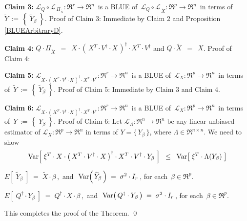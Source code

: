 \begin{enumerate}
	\vskip 0.5cm
	\noindent
	\textbf{Claim 3:}\quad
	$\mathcal{L}_{Q} \circ \mathcal{L}_{\,\Pi_{\widetilde{X}}} : \Re^{r} \longrightarrow \Re^{n}$\,
	is a BLUE of 
	\,$\mathcal{L}_{Q} \circ \mathcal{L}_{\,\widetilde{X}} : \Re^{p} \longrightarrow \Re^{n}$\,
	in terms of
	\,$\widetilde{Y} \,:=\, \left\{\;\widetilde{Y}_{\beta}\;\right\}$.
	\vskip 0.0cm
	\noindent
	Proof of Claim 3:\quad
	Immediate by Claim 2 and Proposition \ref{BLUEArbitraryD}.
	
	\vskip 0.5cm
	\noindent
	\textbf{Claim 4:}\quad
	$Q \cdot \Pi_{\widetilde{X}}$
	\,$=$\, $X \cdot \left(\,X^{T} \cdot V^{\dagger} \cdot X\,\right)^{\dagger} \cdot X^{T} \cdot V^{\dagger}$
	\;\;and\;\;
	$Q \cdot \widetilde{X}$ \,$=$\, $X$.
	\vskip 0.0cm
	\noindent
	Proof of Claim 4:\quad

	\vskip 0.5cm
	\noindent
	\textbf{Claim 5:}\quad
	$\mathcal{L}_{X \cdot \left(\,X^{T} \cdot V^{\dagger} \cdot X\,\right)^{\dagger} \cdot X^{T} \cdot V^{\dagger}}
	: \Re^{r} \longrightarrow \Re^{n}$\,
	is a BLUE of 
	\,$\mathcal{L}_{X} : \Re^{p} \longrightarrow \Re^{n}$\,
	in terms of
	\,$\widetilde{Y} \,:=\, \left\{\;\widetilde{Y}_{\beta}\;\right\}$.
	\vskip 0.0cm
	\noindent
	Proof of Claim 5:\quad
	Immediate by Claim 3 and Claim 4.

	\vskip 0.5cm
	\noindent
	\textbf{Claim 6:}\quad
	$\mathcal{L}_{X \cdot \left(\,X^{T} \cdot V^{\dagger} \cdot X\,\right)^{\dagger} \cdot X^{T} \cdot V^{\dagger}}
	: \Re^{r} \longrightarrow \Re^{n}$\,
	is a BLUE of 
	\,$\mathcal{L}_{X} : \Re^{p} \longrightarrow \Re^{n}$\,
	in terms of
	\,$Y \,:=\, \left\{\;Y_{\beta}\;\right\}$.
	\vskip 0.0cm
	\noindent
	Proof of Claim 6:\quad
	Let $\mathcal{L}_{\Lambda} : \Re^{n} \longrightarrow \Re^{n}$ be any linear unbiased estimator
	of $\mathcal{L}_{X} : \Re^{p} \longrightarrow \Re^{n}$ in terms of $Y = \{\,Y_{\beta}\,\}$,
	where $\Lambda \in \Re^{n \times n}$.
	We need to show
	\begin{equation*}
	\textnormal{Var}\!\left[\;
		\xi^{T}
		\cdot
		X \cdot \left(\,X^{T} \cdot V^{\dagger} \cdot X\,\right)^{\dagger} \cdot X^{T} \cdot V^{\dagger}
		\cdot
		Y_{\beta}
		\;\right]
	\;\;\leq\;\;
	\textnormal{Var}\!\left[\; \xi^{T} \cdot \Lambda(Y_{\beta}) \;\right]
	\end{equation*}

	\vskip 0.5cm
	\noindent
	$E\!\left[\;\widetilde{Y}_{\beta}\;\right] \; = \; \widetilde{X} \cdot \beta$\,,
	\,and\,
	\,$\textnormal{Var}\!\left(\,\widetilde{Y}_{\beta}\,\right) \; = \; \sigma^{2} \cdot I_{r}$\,,
	for each \,$\beta \in \Re^{p}$.

	$E\!\left[\;Q^{\dagger} \cdot Y_{\beta}\;\right] \; = \; Q^{\dagger} \cdot X \cdot \beta$\,,
	\,and\,
	\,$\textnormal{Var}\!\left(\,Q^{\dagger} \cdot Y_{\beta}\,\right) \; = \; \sigma^{2} \cdot I_{r}$\,,
	for each \,$\beta \in \Re^{p}$.	
\end{enumerate}
This completes the proof of the Theorem.
\qed


